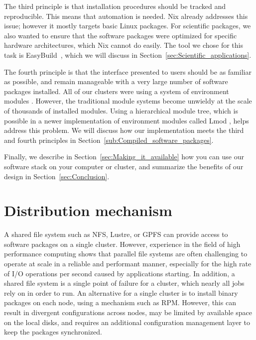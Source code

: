 \documentclass[sigconf]{acmart}
\begin{document}
The third principle is that installation procedures should be tracked and reproducible. This means that automation is needed. Nix already addresses this issue; however it mostly targets basic Linux packages. For scientific packages, we also wanted to ensure that the software packages were optimized for specific hardware architectures, which Nix cannot do easily. The tool we chose for this task is EasyBuild~\cite{EasyBuild2012,EasyBuild2014,EasyBuild2016}, which we will discuss in Section~\ref{sec:Scientific_applications}.

The fourth principle is that the interface presented to users should be as familiar as possible, and remain manageable with a very large number of software packages installed. All of our clusters were using a system of environment modules \cite{Modules1991,Modules1996}. However, the traditional module systems become unwieldy at the scale of thousands of installed modules. Using a hierarchical module tree, which is possible in a newer implementation of environment modules called Lmod \cite{Lmod}, helps address this problem. We will discuss how our implementation meets the third and fourth principles in Section~\ref{sub:Compiled_software_packages}.

Finally, we describe in Section~\ref{sec:Making_it_available} how you can use our software stack on your computer or cluster, and summarize the benefits of our design in Section~\ref{sec:Conclusion}.

\section{Distribution mechanism}
\label{sec:Distribution_mechanism}
A shared file system such as NFS, Lustre, or GPFS can provide access to software packages on a single cluster. However, experience in the field of high performance computing shows that parallel file systems are often challenging to operate at scale in a reliable and performant manner, especially for the high rate of I/O operations per second caused by applications starting. In addition, a shared file system is a single point of failure for a cluster, which nearly all jobs rely on in order to run. An alternative for a single cluster is to install binary packages on each node, using a mechanism such as RPM. However, this can result in divergent configurations across nodes, may be limited by available space on the local disks, and requires an additional configuration management layer to keep the packages synchronized. 
\end{document}

